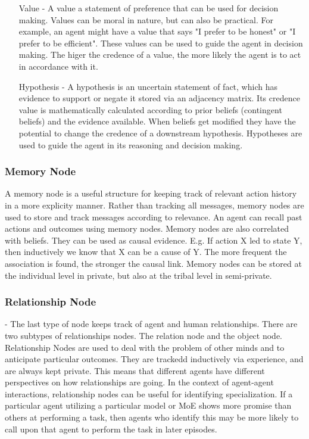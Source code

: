 \begin{itemize}
    \item[Value] - A value a statement of preference that can be used for decision making. Values can be moral in nature, but can also be practical. For example, an agent might have a value that says "I prefer to be honest" or "I prefer to be efficient". These values can be used to guide the agent in decision making. The higer the credence of a value, the more likely the agent is to act in accordance with it.
    \item[Hypothesis] - A hypothesis is an uncertain statement of fact, which has evidence to support or negate it stored via an adjacency matrix. Its credence value is mathematically calculated according to prior beliefs (contingent beliefs) and the evidence available. When beliefs get modified they have the potential to change the credence of a downstream hypothesis. Hypotheses are used to guide the agent in its reasoning and decision making.
\end{itemize}

\subsubsection{Memory Node} A memory node is a useful structure for keeping track of relevant action history in a more explicity manner. Rather than tracking all messages, memory nodes are used to store and track messages according to relevance. An agent can recall past actions and outcomes using memory nodes. Memory nodes are also correlated with beliefs. They can be used as causal evidence. E.g. If action X led to state Y, then inductively we know that X can be a cause of Y. The more frequent the association is found, the stronger the causal link. Memory nodes can be stored at the individual level in private, but also at the tribal level in semi-private.

\subsubsection{Relationship Node} - The last type of node keeps track of agent and human relationships. There are two subtypes of relationships nodes. The relation node and the object node. Relationship Nodes are used to deal with the problem of other minds and to anticipate particular outcomes. They are trackedd inductively via experience, and are always kept private. This means that different agents have different perspectives on how relationships are going. In the context of agent-agent interactions, relationship nodes can be useful for identifying specialization. If a particular agent utilizing a particular model or MoE shows more promise than others at performing a task, then agents who identify this may be more likely to call upon that agent to perform the task in later episodes.

